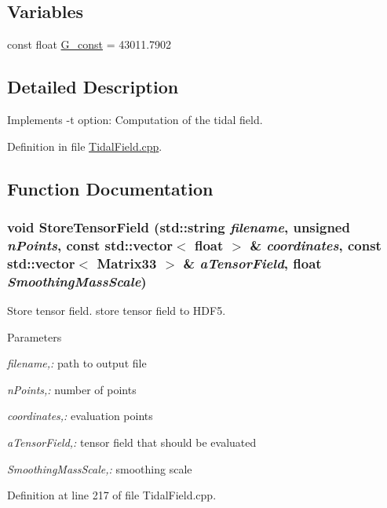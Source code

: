 \subsection*{Variables}
\begin{DoxyCompactItemize}
\item 
const float \hyperlink{TidalField_8cpp_a7b345eb0c3df6f6ba79154edea08afa6}{G\_\-const} = 43011.7902
\end{DoxyCompactItemize}


\subsection{Detailed Description}
Implements -\/t option: Computation of the tidal field. 

Definition in file \hyperlink{TidalField_8cpp_source}{TidalField.cpp}.



\subsection{Function Documentation}
\subsubsection[{StoreTensorField}]{\setlength{\rightskip}{0pt plus 5cm}void StoreTensorField (std::string {\em filename}, \/  unsigned {\em nPoints}, \/  const std::vector$<$ float $>$ \& {\em coordinates}, \/  const std::vector$<$ {\bf Matrix33} $>$ \& {\em aTensorField}, \/  float {\em SmoothingMassScale})}\label{TidalField_8cpp_a4148c344aade56863506eafe83d9161e}


Store tensor field. store tensor field to HDF5. 


\begin{DoxyParams}{Parameters}
\item[{\em filename,:}]path to output file \item[{\em nPoints,:}]number of points \item[{\em coordinates,:}]evaluation points \item[{\em aTensorField,:}]tensor field that should be evaluated \item[{\em SmoothingMassScale,:}]smoothing scale \end{DoxyParams}


Definition at line 217 of file TidalField.cpp.



